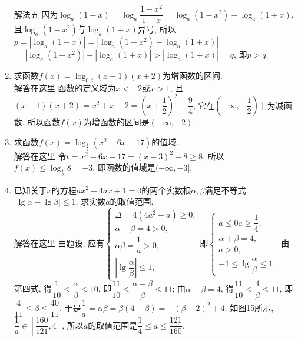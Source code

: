 \documentclass[10pt,a4paper]{article}
\begin{document}
\begin{enumerate}[1.]
解法五  因为$ \log_a(1-x)=\log_a\dfrac{1-x^2}{1+x}=\log_a(1-x^2)-\log_a(1+x)$,
且$\log_a(1-x^2)$与$\log_a(1+x)$异号,
所以$ p=|\log_a(1-x)|=|\log_a(1-x^2)-\log_a(1+x)|$
    $=|\log_a(1-x^2)|+|\log_a(1+x)|>|\log_a(1+x)|=q$,
即$p>q$.
\item 求函数$f(x)=\log_{0.2}(x-1)(x+2)$为增函数的区间.\\
解答在这里  函数的定义域为$x<-2$或$x>1$, 且$(x-1)(x+2)=x^2+x-2=(x+\dfrac 12)^2-\dfrac 94$, 它在$(-\infty ,-\dfrac 12)$上为减函数.
所以函数$f(x)$为增函数的区间是$(-\infty ,-2)$.
\item 求函数$f(x)=\log_{\frac 12}(x^2-6x+17)$的值域.\\
解答在这里 令$t=x^2-6x+17=(x-3)^2+8\ge 8$,
所以$ f(x)\le \log_{\frac 12}8=-3$, 即函数的值域是$(-\infty ,-3]$.
\item 已知关于$x$的方程$ax^2-4ax+1=0$的两个实数根$\alpha ,\beta$满足不等式$|\lg \alpha -\lg \beta|\le 1$, 求实数$a$的取值范围.\\
解答在这里  由题设, 应有$\begin{cases} \Delta =4(4a^2-a)\ge 0, \\ \alpha +\beta =4>0, \\ \alpha \beta =\dfrac 1a>0, \\|\lg \dfrac{\alpha }{\beta }|\le 1, \end{cases}$即$\begin{cases} a\le 0a\ge \dfrac 14, \\ \alpha +\beta =4, \\ a>0, \\ -1\le \lg \dfrac{\alpha }{\beta }\le 1. \end{cases}$
由第四式, 得$\dfrac 1{10}\le \dfrac{\alpha }{\beta }\le 10$, 即$\dfrac{11}{10}\le \dfrac{\alpha +\beta }{\beta }\le 11$;
由$\alpha +\beta =4$, 得$\dfrac{11}{10}\le \dfrac 4{\beta }\le 11$, 即$\dfrac 4{11}\le \beta \le \dfrac{40}{11}$.
于是$\dfrac 1a=\alpha \beta =\beta (4-\beta)=-(\beta -2)^2+4$.
如图15所示, $\dfrac 1a\in [\dfrac{160}{121},4]$, 所以$a$的取值范围是$\dfrac 14\le a\le \dfrac{121}{160}$.
\begin{center}
\end{center}
\end{enumerate}
\end{document}
